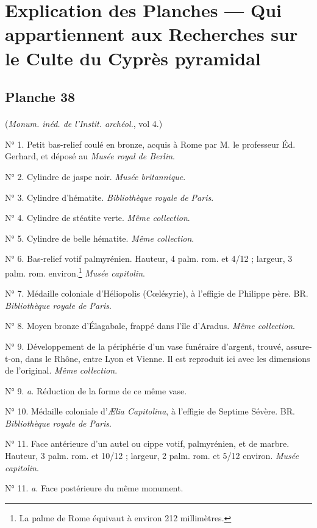 \documentclass[a4paper, 11pt, oneside, polutonikogreek, french]{article}
\begin{document}
\section{Explication des Planches --- Qui appartiennent aux Recherches sur le Culte du Cyprès pyramidal}

\subsection{Planche 38}
\paragraph{}
(\emph{Monum. inéd. de l'Instit. archéol.}, vol 4.)

N° 1. Petit bas-relief coulé en bronze, acquis à Rome par M. le professeur Éd. Gerhard, et déposé au \emph{Musée royal de Berlin}.

N° 2. Cylindre de jaspe noir. \emph{Musée britannique}.

N° 3. Cylindre d'hématite. \emph{Bibliothèque royale de Paris}.

N° 4. Cylindre de stéatite verte. \emph{Même collection}.

N° 5. Cylindre de belle hématite. \emph{Même collection}.

N° 6. Bas-relief votif palmyrénien. Hauteur, 4 palm. rom. et 4/12 ; largeur, 3 palm. rom. environ.\footnote{La palme de Rome équivaut à environ 212 millimètres.} \emph{Musée capitolin}.

N° 7. Médaille coloniale d'Héliopolis (Cœlésyrie), à l'effigie de Philippe père. BR. \emph{Bibliothèque royale de Paris}.

N° 8. Moyen bronze d'Élagabale, frappé dans l'île d'Aradus. \emph{Même collection}.

N° 9. Développement de la périphérie d'un vase funéraire d'argent, trouvé, assure-t-on, dans le Rhône, entre Lyon et Vienne. Il est reproduit ici avec les dimensions de l'original. \emph{Même collection}.

N° 9. \emph{a.} Réduction de la forme de ce même vase.

N° 10. Médaille coloniale d'\emph{Ælia Capitolina}, à l'effigie de Septime Sévère. BR. \emph{Bibliothèque royale de Paris}.

N° 11. Face antérieure d'un autel ou cippe votif, palmyrénien, et de marbre. Hauteur, 3 palm. rom. et 10/12 ; largeur, 2 palm. rom. et 5/12 environ. \emph{Musée capitolin}.

N° 11. \emph{a.} Face postérieure du même monument.
\end{document}

